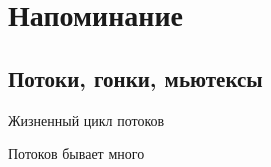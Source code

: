 \section{Напоминание}
\subsection{Потоки, гонки, мьютексы}

\begin{frame}[t,fragile]{Жизненный цикл потоков}
\end{frame}

\begin{frame}[t,fragile]{Потоков бывает много}
\end{frame}

